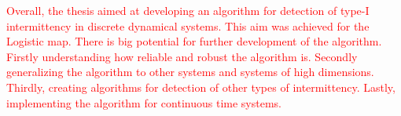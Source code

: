 \par
\textcolor{red}{
Overall, the thesis aimed at developing an algorithm for detection of type-I intermittency in discrete dynamical systems.
This aim was achieved for the Logistic map.
There is big potential for further development of the algorithm.
Firstly understanding how reliable and robust the algorithm is.
Secondly generalizing the algorithm to other systems and systems of high dimensions.
Thirdly, creating algorithms for detection of other types of intermittency.
Lastly, implementing the algorithm for continuous time systems.
}
